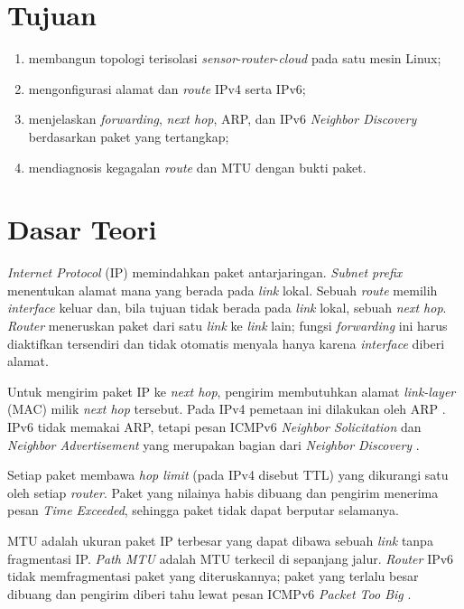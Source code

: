 \documentclass[12pt,a4paper]{report}
\begin{document}
\section{Tujuan}
\begin{enumerate}
    \item membangun topologi terisolasi \emph{sensor}-\emph{router}-\emph{cloud} pada satu mesin Linux;
    \item mengonfigurasi alamat dan \emph{route} IPv4 serta IPv6;
    \item menjelaskan \emph{forwarding}, \emph{next hop}, ARP, dan IPv6 \emph{Neighbor Discovery} berdasarkan paket yang tertangkap;
    \item mendiagnosis kegagalan \emph{route} dan MTU dengan bukti paket.
\end{enumerate}

\section{Dasar Teori}
\emph{Internet Protocol} (IP) memindahkan paket antarjaringan. \emph{Subnet prefix} menentukan alamat mana yang berada pada \emph{link} lokal. Sebuah \emph{route} memilih \emph{interface} keluar dan, bila tujuan tidak berada pada \emph{link} lokal, sebuah \emph{next hop}. \emph{Router} meneruskan paket dari satu \emph{link} ke \emph{link} lain; fungsi \emph{forwarding} ini harus diaktifkan tersendiri dan tidak otomatis menyala hanya karena \emph{interface} diberi alamat.

Untuk mengirim paket IP ke \emph{next hop}, pengirim membutuhkan alamat \emph{link-layer} (MAC) milik \emph{next hop} tersebut. Pada IPv4 pemetaan ini dilakukan oleh ARP \cite{rfc826}. IPv6 tidak memakai ARP, tetapi pesan ICMPv6 \emph{Neighbor Solicitation} dan \emph{Neighbor Advertisement} yang merupakan bagian dari \emph{Neighbor Discovery} \cite{rfc4861}.

Setiap paket membawa \emph{hop limit} (pada IPv4 disebut TTL) yang dikurangi satu oleh setiap \emph{router}. Paket yang nilainya habis dibuang dan pengirim menerima pesan \emph{Time Exceeded}, sehingga paket tidak dapat berputar selamanya.

MTU adalah ukuran paket IP terbesar yang dapat dibawa sebuah \emph{link} tanpa fragmentasi IP. \emph{Path MTU} adalah MTU terkecil di sepanjang jalur. \emph{Router} IPv6 tidak memfragmentasi paket yang diteruskannya; paket yang terlalu besar dibuang dan pengirim diberi tahu lewat pesan ICMPv6 \emph{Packet Too Big} \cite{rfc8200,rfc8201}.
\end{document}
